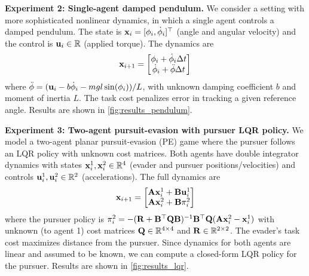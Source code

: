 \textbf{Experiment 2: Single-agent damped pendulum.} 
We consider a setting with more sophisticated nonlinear dynamics, in which a single agent controls a damped pendulum. The state is $\mathbf{x}_i = [\phi_i, \dot{\phi}_i]^\top$ (angle and angular velocity) and the control is $\mathbf{u}_i \in \mathbb{R}$ (applied torque). The dynamics are
\begin{equation*}
    \mathbf{x}_{i+1} = \begin{bmatrix}
        \phi_i + \dot{\phi}_i \Delta t \\
        \dot{\phi}_i + \ddot{\phi} \Delta t
    \end{bmatrix}
\end{equation*}
where $\ddot{\phi} = (\mathbf{u}_i - b\dot{\phi}_i - mgl\sin(\phi_i))/L$, with unknown damping coefficient $b$ and moment of inertia $L$. The task cost penalizes error in tracking a given reference angle. Results are shown in \cref{fig:results_pendulum}.

\textbf{Experiment 3: Two-agent pursuit-evasion with pursuer LQR policy.} 
We model a two-agent planar pursuit-evasion (PE) game where the pursuer follows an LQR policy with unknown cost matrices. Both agents have double integrator dynamics with states $\mathbf{x}_i^1, \mathbf{x}_i^2 \in \mathbb{R}^4$ (evader and pursuer positions/velocities) and controls $\mathbf{u}_i^1, \mathbf{u}_i^2 \in \mathbb{R}^2$ (accelerations). The full dynamics are
\begin{equation*}
    \mathbf{x}_{i+1} = \begin{bmatrix}
        \mathbf{A} \mathbf{x}^1_i + \mathbf{B} \mathbf{u}^1_i \\
        \mathbf{A} \mathbf{x}^2_i + \mathbf{B} \mathbf{\pi}^2_i
    \end{bmatrix}
\end{equation*}
where the pursuer policy is $\mathbf{\pi}^2_i = -(\mathbf{R} + \mathbf{B}^\top \mathbf{Q} \mathbf{B})^{-1} \mathbf{B}^\top \mathbf{Q} (\mathbf{A} \mathbf{x}^2_i - \mathbf{x}^1_i)$ with unknown (to agent 1) cost matrices $\mathbf{Q} \in \mathbb{R}^{4 \times 4}$ and $\mathbf{R} \in \mathbb{R}^{2 \times 2}$. The evader's task cost maximizes distance from the pursuer. Since dynamics for both agents are linear and assumed to be known, we can compute a closed-form LQR policy for the pursuer. Results are shown in \cref{fig:results_lqr}.

